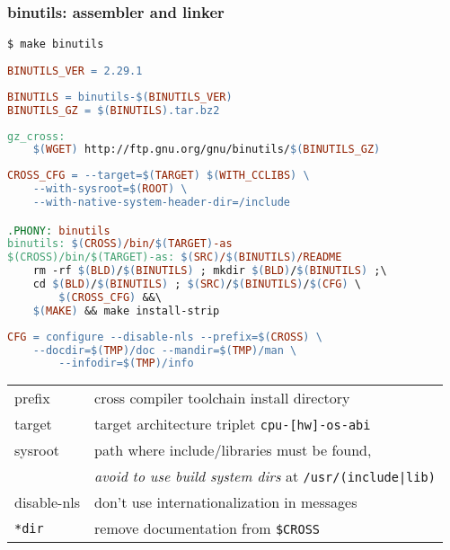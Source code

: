 \subsubsection{binutils: assembler and linker}

\begin{lstlisting}
$ make binutils
\end{lstlisting}
\begin{lstlisting}[language=make,title=mk/version]
BINUTILS_VER = 2.29.1
\end{lstlisting}
\begin{lstlisting}[language=make,title=mk/package]
BINUTILS = binutils-$(BINUTILS_VER)
BINUTILS_GZ = $(BINUTILS).tar.bz2
\end{lstlisting}
\begin{lstlisting}[language=make,title=mk/gz]
gz_cross:
	$(WGET) http://ftp.gnu.org/gnu/binutils/$(BINUTILS_GZ)
\end{lstlisting}
\begin{lstlisting}[language=make,title=mk/cross]
CROSS_CFG = --target=$(TARGET) $(WITH_CCLIBS) \
	--with-sysroot=$(ROOT) \
	--with-native-system-header-dir=/include  

.PHONY: binutils
binutils: $(CROSS)/bin/$(TARGET)-as
$(CROSS)/bin/$(TARGET)-as: $(SRC)/$(BINUTILS)/README
	rm -rf $(BLD)/$(BINUTILS) ; mkdir $(BLD)/$(BINUTILS) ;\
	cd $(BLD)/$(BINUTILS) ; $(SRC)/$(BINUTILS)/$(CFG) \
		$(CROSS_CFG) &&\
	$(MAKE) && make install-strip
\end{lstlisting}
\begin{lstlisting}[language=make,title=mk/cfg]
CFG = configure --disable-nls --prefix=$(CROSS) \
	--docdir=$(TMP)/doc --mandir=$(TMP)/man \
		--infodir=$(TMP)/info
\end{lstlisting}

\begin{tabular}{l l}
prefix & cross compiler toolchain install directory\\
target & target architecture triplet \verb|cpu-[hw]-os-abi| \\
sysroot & path where include/libraries must be found,\\
& \emph{avoid to use build system dirs} at \verb$/usr/(include|lib)$\\
\hline
disable-nls & don't use internationalization in messages \\
\verb$*dir$ & remove documentation from \verb|$CROSS|\\
\end{tabular}

